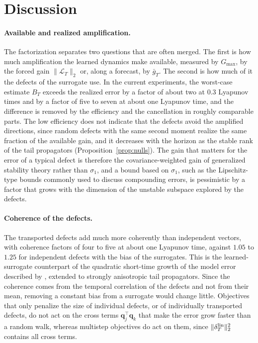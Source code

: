 \section{Discussion}
\label{sec:discussion}

\paragraph{Available and realized amplification.}
The factorization separates two questions that are often merged. The first is how much amplification the learned dynamics make available, measured by $G_{\max}$, by the forced gain $\|\mathcal L_T\|_2$ or, along a forecast, by $\bar g_T$. The second is how much of it the defects of the surrogate use. In the current experiments, the worst-case estimate $B_T$ exceeds the realized error by a factor of about two at $0.3$ Lyapunov times and by a factor of five to seven at about one Lyapunov time, and the difference is removed by the efficiency and the cancellation in roughly comparable parts. The low efficiency does not indicate that the defects avoid the amplified directions, since random defects with the same second moment realize the same fraction of the available gain, and it decreases with the horizon as the stable rank of the tail propagators (Proposition~\ref{prop:nulls}). The gain that matters for the error of a typical defect is therefore the covariance-weighted gain of generalized stability theory \citep{farrell1996a,farrell1996b} rather than $\sigma_1$, and a bound based on $\sigma_1$, such as the Lipschitz-type bounds commonly used to discuss compounding errors, is pessimistic by a factor that grows with the dimension of the unstable subspace explored by the defects.

\paragraph{Coherence of the defects.}
The transported defects add much more coherently than independent vectors, with coherence factors of four to five at about one Lyapunov time, against $1.05$ to $1.25$ for independent defects with the bias of the surrogates. This is the learned-surrogate counterpart of the quadratic short-time growth of the model error described by \citet{vannitsem2002}, extended to strongly anisotropic tail propagators. Since the coherence comes from the temporal correlation of the defects and not from their mean, removing a constant bias from a surrogate would change little. Objectives that only penalize the size of individual defects, or of individually transported defects, do not act on the cross terms $\mathbf q_j^\top\mathbf q_k$ that make the error grow faster than a random walk, whereas multistep objectives do act on them, since $\|\delta^{\rm lin}_T\|_2^2$ contains all cross terms.

